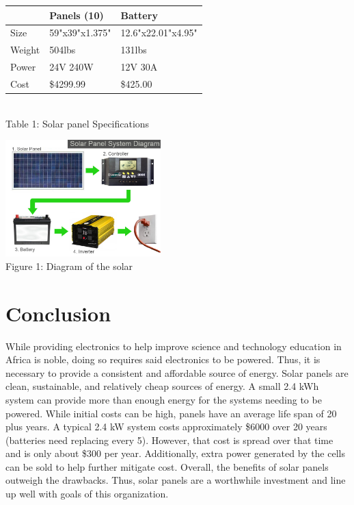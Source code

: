 \documentclass[letter, 11pt]{article}
\begin{document}
\begin{center}
\begin{tabu} to 0.8\textwidth { | X[l] | X[c] | X[r] | }
\hline
 & Panels (10) & Battery \\
\hline
 Size & 59"x39"x1.375" & 12.6"x22.01"x4.95" \\
\hline
 Weight  & 504lbs & 131lbs  \\
\hline
 Power  & 24V 240W  & 12V 30A  \\
\hline
 Cost  & \$4299.99  & \$425.00  \\
\hline
\end{tabu}
\\ Table 1: Solar panel Specifications

\includegraphics[width=60mm]{system-diagram.jpg} \\
Figure 1: Diagram of the solar 
\end{center}

\section*{Conclusion}

While providing electronics to help improve science and technology education in Africa is noble, doing so requires said electronics to be powered. Thus, it is necessary to provide a consistent and affordable source of energy. Solar panels are clean, sustainable, and relatively cheap sources of energy. A small 2.4 kWh system can provide more than enough energy for the systems needing to be powered. While initial costs can be high, panels have an average life span of 20 plus years. A typical 2.4 kW system costs approximately \$6000 over 20 years (batteries need replacing every 5). However, that cost is spread over that time and is only about \$300 per year. Additionally, extra power generated by the cells can be sold to help further mitigate cost. Overall, the benefits of solar panels outweigh the drawbacks. Thus, solar panels are a worthwhile investment and line up well with goals of this organization.
\end{document}
